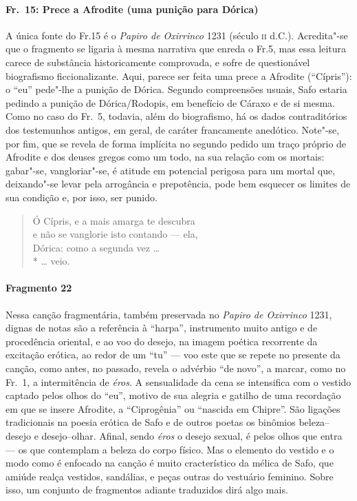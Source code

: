 \paragraph{Fr.~15: Prece a Afrodite (uma punição para Dórica)}

{\small A única fonte do Fr.15 é o \textit{Papiro de Oxirrinco} 1231 (século \textsc{ii} d.C.).
Acredita"-se que o fragmento se ligaria à mesma narrativa que enreda o Fr.5, mas essa
leitura carece de substância historicamente comprovada, e sofre de
questionável biografismo ficcionalizante. Aqui,
parece ser feita uma prece a Afrodite (“Cípris”): o “eu” pede"-lhe a
punição de Dórica. Segundo compreensões usuais, Safo estaria pedindo a punição
de Dórica/Rodopis, em benefício de Cáraxo e de si mesma. Como no caso do Fr.~5,
todavia, além do biografismo, há os dados contraditórios dos testemunhos
antigos, em geral, de caráter francamente anedótico. Note"-se, por fim, que se
revela de forma implícita no segundo pedido um traço próprio de Afrodite e dos
deuses gregos como um todo, na sua relação com os mortais: gabar"-se,
vangloriar"-se, é atitude em potencial perigosa para um mortal que,
deixando"-se levar pela arrogância e prepotência, pode bem esquecer
os limites de sua condição e, por isso, ser punido.}

\begin{verse}
Ó Cípris, e a mais amarga te descubra\\
e não se vanglorie isto contando --- ela,\\
Dórica: como a segunda vez \ldots{}\\*
\ldots{} veio.
\end{verse}


\paragraph{Fragmento 22}

{\small Nessa canção fragmentária, também preservada no \textit{Papiro de Oxirrinco}
1231, dignas de notas são a referência à ``harpa'', instrumento muito
antigo e de procedência oriental, e ao voo do desejo, na imagem poética
recorrente da excitação erótica, ao redor de um “tu” --- voo este que se repete
no presente da canção, como antes, no passado, revela o advérbio ``de
novo”, a marcar, como no Fr.~1, a intermitência de \textit{éros}. A
sensualidade da cena se intensifica com o vestido captado pelos olhos do “eu”,
motivo de sua alegria e gatilho de uma recordação em que se insere Afrodite, a
``Ciprogênia'' ou “nascida em Chipre”. São ligações tradicionais na
poesia erótica de Safo e de outros poetas os binômios beleza--desejo e
desejo--olhar. Afinal, sendo \textit{éros} o desejo sexual, é pelos olhos que entra --- os que contemplam a beleza do corpo físico. Mas o elemento do vestido e o modo como é enfocado na canção é muito cracterístico da mélica de Safo, que amiúde realça vestidos, sandálias, e peças outras do vestuário feminino. Sobre isso, um conjunto de fragmentos adiante traduzidos dirá algo mais.}

